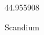 \documentclass[12pt]{article}
\begin{document}
\hfill{}
\vfill
\begin{center}
  {\fontsize{50}{60}
  }

  \vspace{1em}

  44.955908

Scandium
\end{center}
\vfill
\end{document}
